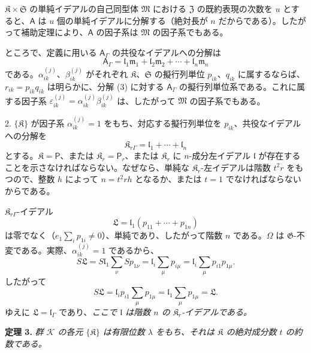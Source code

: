 \(\mathfrak K\times\mathfrak S\) の単純イデアルの自己同型体 \(\mathfrak M\) における \(\mathfrak Z\) の既約表現の次数を \(u\) とすると、\(\mathsf{A}\) は \(u\) 個の単純イデアルに分解する（絶対長が \(n\) だからである）。したがって補助定理により、\(\mathsf{A}\) の因子系は \(\mathfrak M\) の因子系でもある。

ところで、定義に用いる \(\mathsf{A}_\Gamma\) の共役なイデアルへの分解は
\[
\tag{3}
\mathsf{A}_\Gamma=\mathfrak l_1\mathfrak m_1+\mathfrak l_2\mathfrak m_2+\cdots+\mathfrak l_n\mathfrak m_n
\]
である。\(\alpha_{ik}^{(j)}\)、\(\beta_{ik}^{(j)}\) がそれぞれ \(\mathfrak K\)、\(\mathfrak S\) の擬行列単位 \(p_{ik}\)、\(q_{ik}\) に属するならば、\(r_{ik}=p_{ik}q_{ik}\) は明らかに、分解 (3) に対する \(\mathsf{A}_\Gamma\) の擬行列単位系である。これに属する因子系 \(\varepsilon_{ik}^{(j)}=\alpha_{ik}^{(j)}\beta_{ik}^{(j)}\) は、したがって \(\mathfrak M\) の因子系でもある。

2. \(\{\mathfrak K\}\) が因子系 \(\alpha_{ik}^{(j)}=1\) をもち、対応する擬行列単位を \(p_{ik}\)、共役なイデアルへの分解を
\[
\mathfrak K_{r\Gamma}=\mathfrak l_1+\cdots+\mathfrak l_n
\]
とする。\(\mathfrak K=\mathsf P\)、または \(\mathfrak K_r=\mathsf P_r\)、または \(\mathfrak K_r\) に \(n\)-成分左イデアル \(\mathfrak l\) が存在することを示さなければならない。なぜなら、単純な \(\mathfrak K_r\)-左イデアルは階数 \(t^2r\) をもつので、整数 \(h\) によって \(n=t^2rh\) となるか、または \(t=1\) でなければならないからである。

\(\mathfrak K_{r\Gamma}\)-イデアル
\[
\mathfrak L=\mathfrak l_1(p_{11}+\cdots+p_{1n})
\]
は零でなく（\(e_1\sum_i p_{1i}\ne0\)）、単純であり、したがって階数 \(n\) である。\(\Omega\) は \(\mathfrak G\)-不変である。実際、\(\alpha_{ik}^{(j)}=1\) であるから、
\[
S\mathfrak L
=S\mathfrak l_1\sum_\nu S p_{1\nu}
=\mathfrak l_i\sum_\mu p_{i\mu}
=\mathfrak l_i\sum_\mu p_{i1}p_{1\mu}.
\]
したがって
\[
S\mathfrak L=\mathfrak l_ip_{i1}\sum_\mu p_{1\mu}
=\mathfrak l_1\sum_\mu p_{1\mu}
=\mathfrak L.
\]
ゆえに \(\mathfrak L=\mathfrak l_\Gamma\) であり、\emph{ここで \(\mathfrak l\) は階数 \(n\) の \(\mathfrak K_r\)-イデアルである。}

\textbf{定理 3.} \emph{群 \(\mathscr K\) の各元 \(\{\mathfrak K\}\) は有限位数 \(\lambda\) をもち、それは \(\mathfrak K\) の絶対成分数 \(t\) の約数である。}

